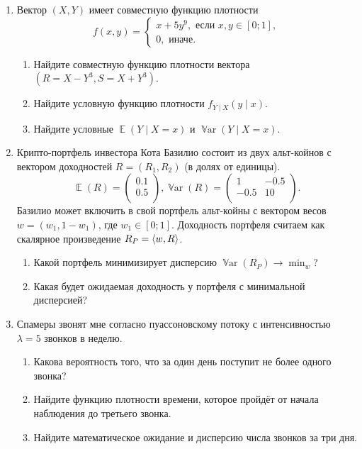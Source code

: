\documentclass[12pt]{article}
\DeclareMathOperator{\Var}{\mathbb{V}ar}
\DeclarePairedDelimiter{\scalp}{\langle}{\rangle}
\DeclareMathOperator{\E}{\mathbb{E}}
\begin{document}
\begin{enumerate}
    \item Вектор $(X, Y)$ имеет совместную функцию плотности 
    \[
    f(x, y) = \begin{cases}
        x + 5y^9, \text{ если } x, y \in [0;1], \\
        0, \text{ иначе.}
    \end{cases}
    \]
    \begin{enumerate}
        \item Найдите совместную функцию плотности вектора $(R = X - Y^3, S = X + Y^3)$.
        \item Найдите условную функцию плотности $f_{Y\mid X}(y \mid x)$.
        \item Найдите условные $\E(Y\mid X = x)$ и $\Var(Y \mid X = x)$.
    \end{enumerate}

    \item Крипто-портфель инвестора Кота Базилио состоит из двух альт-койнов с вектором доходностей $R = (R_1, R_2)$ (в долях от единицы).
    \[
    \E(R) = \begin{pmatrix}
        0.1 \\
        0.5 \\
    \end{pmatrix}, 
    \Var(R) = \begin{pmatrix}
        1 & -0.5 \\
        -0.5 & 10 \\
    \end{pmatrix}.
    \]
    Базилио может включить в свой портфель альт-койны с вектором весов $w = (w_1, 1 - w_1)$, где $w_1 \in [0;1]$.
    Доходность портфеля считаем как скалярное произведение $R_P = \scalp{w, R}$.
    
    \begin{enumerate}
        \item Какой портфель минимизирует дисперсию $\Var(R_P) \to \min_w$?
        \item Какая будет ожидаемая доходность у портфеля с минимальной дисперсией?
    \end{enumerate}

    \item Спамеры звонят мне согласно пуассоновскому потоку с интенсивностью $\lambda = 5$ звонков в неделю. 
    \begin{enumerate}
        \item Какова вероятность того, что за один день поступит не более одного звонка?
        \item Найдите функцию плотности времени, которое пройдёт от начала наблюдения до третьего звонка. 
        \item Найдите математическое ожидание и дисперсию числа звонков за три дня. 
    \end{enumerate}


\end{enumerate}
\end{document}
